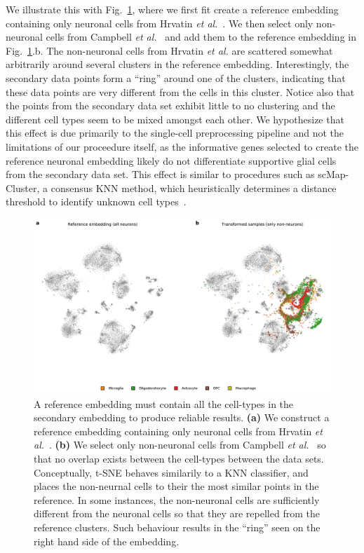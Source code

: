 \documentclass[runningheads]{llncs}
\newcommand{\etal}{\textit{et al.}}
\begin{document}
We illustrate this with Fig.~\ref{fig:incomplete_reference}, where we first fit
create a reference embedding containing only neuronal cells from Hrvatin
\etal~\cite{Hrvatin2018}. We then select only non-neuronal cells from Campbell
\etal~\cite{Campbell2017} and add them to the reference embedding in
Fig.~\ref{fig:incomplete_reference}.b. The non-neuronal cells from Hrvatin \etal
are scattered somewhat arbitrarily around several clusters in the reference
embedding. Interestingly, the secondary data points form a ``ring'' around one
of the clusters, indicating that these data points are very different from the
cells in this cluster. Notice also that the points from the secondary data set
exhibit little to no clustering and the different cell types seem to be mixed
amongst each other. We hypothesize that this effect is due primarily to the
single-cell preprocessing pipeline and not the limitations of our proceedure
itself, as the informative genes selected to create the reference neuronal
embedding likely do not differentiate supportive glial cells from the secondary
data set. This effect is similar to procedures such as scMap-Cluster, a consensus KNN
method, which heuristically determines a distance threshold to identify unknown
cell types~\cite{Kiselev2018}.

\begin{figure}[htb]
  \includegraphics[width=\textwidth]{incomplete_reference-brain.pdf}
  \caption{A reference embedding must contain all the cell-types in the
  secondary embedding to produce reliable results. {\bf (a)} We construct a
  reference embedding containing only neuronal cells from Hrvatin
  \etal~\cite{Hrvatin2018}. {\bf (b)} We select only non-neuronal cells from
  Campbell \etal~\cite{Campbell2017} so that no overlap exists between the
  cell-types between the data sets. Conceptually, t-SNE behaves similarily to a
  KNN classifier, and places the non-neurnal cells to their the most similar
  points in the reference. In some instances, the non-neuronal cells are
  sufficiently different from the neuronal cells so that they are repelled from
  the reference clusters. Such behaviour results in the ``ring'' seen on the
  right hand side of the embedding.} \label{fig:incomplete_reference}
\end{figure}
\end{document}
